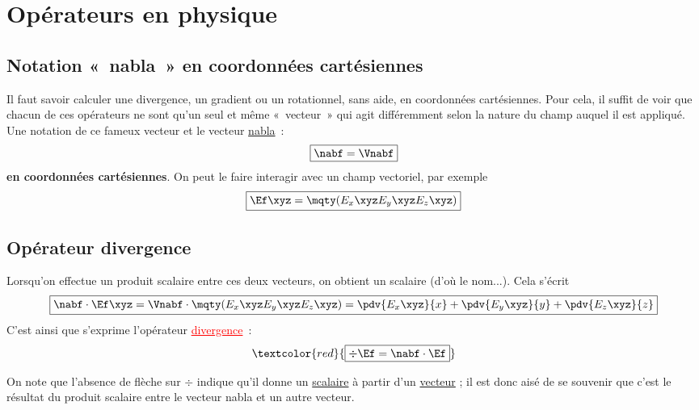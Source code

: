 \documentclass[a4paper, 12pt, garamond]{book}
\begin{document}
\setcounter{chapter}{9}

\chapter{Opérateurs en physique}

\section{Notation «~nabla~» en coordonnées cartésiennes}

Il faut savoir calculer une divergence, un gradient ou un rotationnel, sans aide, en coordonnées cartésiennes. Pour cela, il suffit de voir que chacun de ces opérateurs ne sont qu'un seul et même «~vecteur~» qui agit différemment selon la nature du champ auquel il est appliqué.
\smallbreak
Une notation de ce fameux vecteur et le vecteur \ul{nabla}~:
\begin{equation*}
	\boxed{\nabf = \Vnabf}
\end{equation*}
\textbf{en coordonnées cartésiennes}. On peut le faire interagir avec un champ vectoriel, par exemple
\begin{equation*}
	\boxed{\Ef\xyz = \mqty(E_x\xyz\\E_y\xyz\\E_z\xyz)}
\end{equation*}

\section{Opérateur divergence}

Lorsqu'on effectue un \textcolor{brandeisblue}{produit scalaire} entre ces deux vecteurs, on obtient un \textcolor{brandeisblue}{scalaire} (d'où le nom...). Cela s'écrit
\textcolor{brandeisblue}{
	\begin{equation*}
		\boxed{\nabf\cdot\Ef\xyz =
			\Vnabf\cdot\mqty(E_x\xyz\\E_y\xyz\\E_z\xyz) =
			\pdv{E_x\xyz}{x} + \pdv{E_y\xyz}{y} + \pdv{E_z\xyz}{z}}
	\end{equation*}
}
C'est ainsi que s'exprime l'opérateur \textcolor{red}{\ul{divergence}}~:
\begin{equation*}
	\textcolor{red}{\boxed{\div\Ef = \nabf\cdot\Ef}}
\end{equation*}

On note que l'absence de flèche sur $\div$ indique qu'il donne un \ul{scalaire}
à partir d'un \ul{vecteur} ; il est donc aisé de se souvenir que c'est le
résultat du produit scalaire entre le vecteur nabla et un autre
vecteur.
\end{document}
